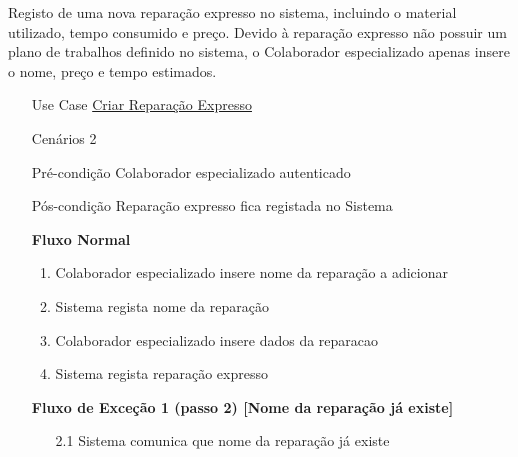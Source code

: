\documentclass[../relatorio.tex]{subfiles}
\begin{document}
Registo de uma nova reparação expresso no sistema, incluindo o material utilizado, tempo consumido e preço.
Devido à reparação expresso não possuir um plano de trabalhos definido no sistema, o Colaborador especializado
apenas insere o nome, preço e tempo estimados.
\begin{itemize}
    \item[Use Case] {\underline{Criar Reparação Expresso}}
    \item[Cenários] {2}
    \item[Pré-condição] {Colaborador especializado autenticado}
    \item[Pós-condição] {Reparação expresso fica registada no Sistema}
          \begin{flushleft}
              \textbf{Fluxo Normal}
          \end{flushleft}
          \begin{enumerate}
              \item Colaborador especializado insere nome da reparação a adicionar
              \item Sistema regista nome da reparação
              \item Colaborador especializado insere dados da reparacao %
              \item Sistema regista reparação expresso
          \end{enumerate}
          \begin{flushleft}
            \textbf{Fluxo de Exceção 1 (passo 2) [Nome da reparação já existe]}
        \end{flushleft}
        \begin{itemize}
            \item[2.1] Sistema comunica que nome da reparação já existe
        \end{itemize}
\end{itemize}
\end{document}
